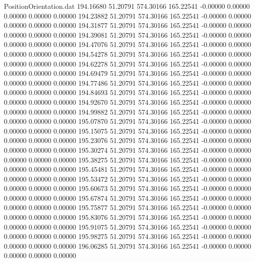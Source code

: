 \begin{filecontents}{PositionOrientation.dat}
 194.16680   51.20791  574.30166   165.22541   -0.00000    0.00000    0.00000    0.00000    0.00000
 194.23882   51.20791  574.30166   165.22541   -0.00000    0.00000    0.00000    0.00000    0.00000
 194.31877   51.20791  574.30166   165.22541   -0.00000    0.00000    0.00000    0.00000    0.00000
 194.39081   51.20791  574.30166   165.22541   -0.00000    0.00000    0.00000    0.00000    0.00000
 194.47076   51.20791  574.30166   165.22541   -0.00000    0.00000    0.00000    0.00000    0.00000
 194.54278   51.20791  574.30166   165.22541   -0.00000    0.00000    0.00000    0.00000    0.00000
 194.62278   51.20791  574.30166   165.22541   -0.00000    0.00000    0.00000    0.00000    0.00000
 194.69479   51.20791  574.30166   165.22541   -0.00000    0.00000    0.00000    0.00000    0.00000
 194.77486   51.20791  574.30166   165.22541   -0.00000    0.00000    0.00000    0.00000    0.00000
 194.84693   51.20791  574.30166   165.22541   -0.00000    0.00000    0.00000    0.00000    0.00000
 194.92670   51.20791  574.30166   165.22541   -0.00000    0.00000    0.00000    0.00000    0.00000
 194.99882   51.20791  574.30166   165.22541   -0.00000    0.00000    0.00000    0.00000    0.00000
 195.07870   51.20791  574.30166   165.22541   -0.00000    0.00000    0.00000    0.00000    0.00000
 195.15075   51.20791  574.30166   165.22541   -0.00000    0.00000    0.00000    0.00000    0.00000
 195.23076   51.20791  574.30166   165.22541   -0.00000    0.00000    0.00000    0.00000    0.00000
 195.30274   51.20791  574.30166   165.22541   -0.00000    0.00000    0.00000    0.00000    0.00000
 195.38275   51.20791  574.30166   165.22541   -0.00000    0.00000    0.00000    0.00000    0.00000
 195.45481   51.20791  574.30166   165.22541   -0.00000    0.00000    0.00000    0.00000    0.00000
 195.53472   51.20791  574.30166   165.22541   -0.00000    0.00000    0.00000    0.00000    0.00000
 195.60673   51.20791  574.30166   165.22541   -0.00000    0.00000    0.00000    0.00000    0.00000
 195.67874   51.20791  574.30166   165.22541   -0.00000    0.00000    0.00000    0.00000    0.00000
 195.75877   51.20791  574.30166   165.22541   -0.00000    0.00000    0.00000    0.00000    0.00000
 195.83076   51.20791  574.30166   165.22541   -0.00000    0.00000    0.00000    0.00000    0.00000
 195.91075   51.20791  574.30166   165.22541   -0.00000    0.00000    0.00000    0.00000    0.00000
 195.98275   51.20791  574.30166   165.22541   -0.00000    0.00000    0.00000    0.00000    0.00000
 196.06285   51.20791  574.30166   165.22541   -0.00000    0.00000    0.00000    0.00000    0.00000

\end{filecontents}
